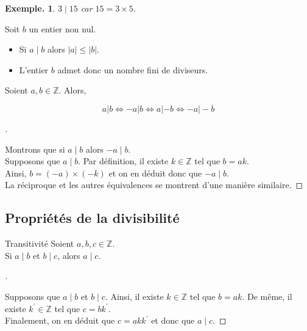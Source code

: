 \documentclass[12pt]{article}
\newcommand{\hideM}[1]{#1}
\theoremstyle{break}
\newtheorem*{example}{Exemple.}
\newenvironment{demo}[1][\proofname]{%
  \begin{proof}[#1]$ $\newline
}{%
  \end{proof}
}
\begin{document}
\begin{example}
    $3 \mid 15$ car $15=3 \times 5$.
\end{example}

\begin{proposition}{}{}
    Soit $b$ un entier non nul.
    \begin{itemize}[noitemsep,topsep=0pt]
      \item Si $\hideM{a \mid b}$ alors $\hideM{|a| \leqslant|b|}$.
      \item L'entier $b$ admet donc un nombre fini de diviseurs.
    \end{itemize}
\end{proposition}

\begin{proposition}{}{}
    Soient $a, b \in \mathbb{Z}$. Alors,
    
    $$
    a|b \Longleftrightarrow \hideM{-a| b }\Longleftrightarrow \hideM{ a|-b }\Longleftrightarrow \hideM{-a|-b}
    $$
\end{proposition}

\begin{demo}
    Montrons que si $a \mid b$ alors $-a \mid b$.\\
    Supposons que $a \mid b$. Par définition, il existe $k \in \mathbb{Z}$ tel que $b=a k$.\\
    Ainsi, $b=(-a) \times(-k)$ et on en déduit donc que $-a \mid b$.\\
    La réciproque et les autres équivalences se montrent d'une manière similaire.
\end{demo}

\subsection{Propriétés de la divisibilité}
\begin{proposition}{Transitivité}{}
    Soient $a, b, c \in \mathbb{Z}$.\\
    Si $a \mid b$ et $b \mid c$, alors $\hideM{a \mid c}$.
\end{proposition}

\begin{demo}
    Supposons que $a \mid b$ et $b \mid c$. Ainsi, il existe $k \in \mathbb{Z}$ tel que $b=a k$. De même, il existe $k^{\prime} \in \mathbb{Z}$ tel que $c=b k^{\prime}$.\\
    Finalement, on en déduit que $c=a k k^{\prime}$ et donc que $a \mid c$.
\end{demo}
\end{document}
